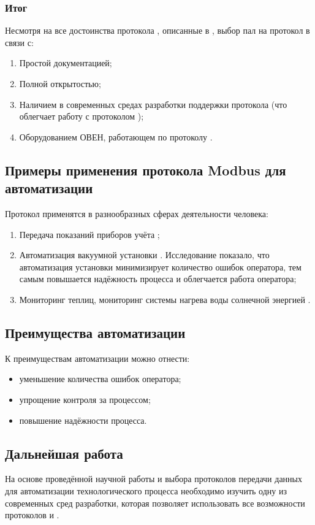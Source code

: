 \subsubsection{Итог}
Несмотря на все достоинства протокола \pb, описанные в \cite{powell_profibus_2013}, выбор пал на протокол \mb \tcp в связи с:
\begin{enumerate}
	\item Простой документацией;
	\item Полной открытостью;
	\item Наличием в современных средах разработки поддержки протокола \tcp (что облегчает работу с протоколом \mb \tcp);
	\item Оборудованием ОВЕН, работающем по протоколу \mb.
\end{enumerate}
\subsection{Примеры применения протокола Modbus для автоматизации}
Протокол применятся в разнообразных сферах деятельности человека:
\begin{enumerate}
	\item Передача показаний приборов учёта \cite{__2016};
	\item Автоматизация вакуумной установки \cite{__2017}. Исследование показало, что автоматизация установки минимизирует количество ошибок оператора, тем самым повышается надёжность процесса и облегчается работа оператора;
	\item Мониторинг теплиц, мониторинг системы нагрева воды солнечной энергией \cite{advantech__2019}.
\end{enumerate}
\subsection{Преимущества автоматизации}
К преимуществам автоматизации можно отнести:
\begin{itemize}
	\item уменьшение количества ошибок оператора;
	\item упрощение контроля за процессом;
	\item повышение надёжности процесса.
\end{itemize}
\subsection{Дальнейшая работа}
На основе проведённой научной работы и выбора протоколов передачи данных для автоматизации технологического процесса необходимо изучить одну из современных сред разработки, которая позволяет использовать все возможности протоколов \mb и \tcp.